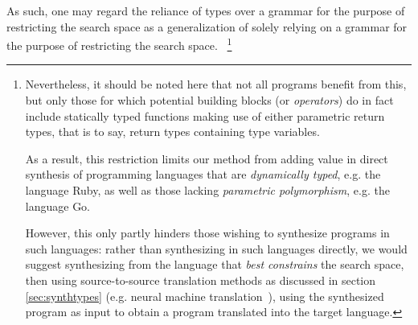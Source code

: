 \documentclass{article}
\begin{document}
As such, one may regard the reliance of types over a grammar for the purpose of restricting the search space as a generalization of solely relying on a grammar for the purpose of restricting the search space.%
~\footnote{
    Nevertheless, it should be noted here that not all programs benefit from this,
    but only those for which potential building blocks (or \emph{operators}) do in fact include statically typed functions making use of either parametric return types, that is to say, return types containing type variables.

    As a result, this restriction limits our method from adding value in direct synthesis of programming languages that are \emph{dynamically typed},
    e.g. the language Ruby, as well as those lacking \emph{parametric polymorphism}, e.g. the language Go.

    However, this only partly hinders those wishing to synthesize programs in such languages:
    rather than synthesizing in such languages directly, we would suggest synthesizing from the language that \emph{best constrains} the search space,
    then using source-to-source translation methods as discussed in section
    \ref{sec:synthtypes}
    (e.g. neural machine translation~\citep{kalchbrenner2013recurrent}),
    using the synthesized program as input to obtain a program translated into the target language.
}




\end{document}
